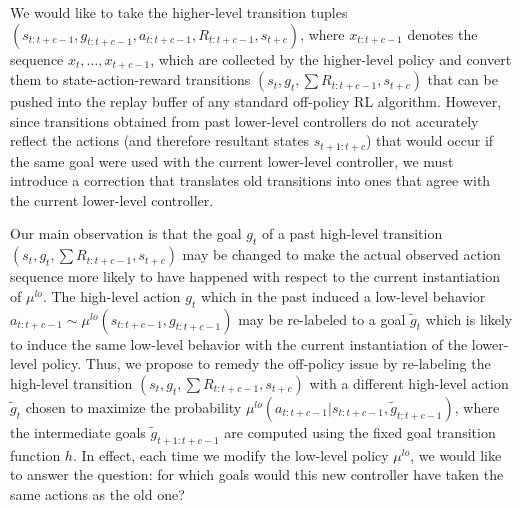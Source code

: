 \documentclass{article}
\begin{document}
We would like to take the higher-level transition tuples $(s_{t:t+c-1}, g_{t:t+c-1}, a_{t:t+c-1}, R_{t:t+c-1}, s_{t+c})$, where $x_{t:t+c-1}$ denotes the sequence $x_t,\dots,x_{t+c-1}$,
which are collected by the higher-level policy and convert them to state-action-reward transitions
$(s_t, g_t, \sum R_{t:t+c-1}, s_{t+c})$ that can be pushed into the replay buffer of any standard off-policy RL algorithm.
However, since transitions obtained from past lower-level controllers do not accurately reflect the actions (and therefore resultant states $s_{t+1:t+c}$) that would occur if the same goal were used with the current lower-level controller, we must introduce a correction that translates old transitions into ones that agree with the current lower-level controller.%


Our main observation is that the goal $g_t$ of a past high-level transition $(s_t, g_t, \sum R_{t:t+c-1}, s_{t+c})$ may be changed to make the actual observed action sequence more likely to have happened with respect to the current instantiation of $\mu^{lo}$.
The high-level action $g_t$ which in the past induced a low-level behavior $a_{t:t+c-1}\sim\mu^{lo}(s_{t:t+c-1}, g_{t:t+c-1})$ may be re-labeled to a goal $\tilde{g}_t$ which is likely to induce the same low-level behavior with the current instantiation of the lower-level policy.
Thus, we propose to remedy the off-policy issue by re-labeling the high-level transition $(s_t, g_t, \sum R_{t:t+c-1}, s_{t+c})$ with a different high-level action $\tilde{g}_t$ chosen to maximize the
probability $\mu^{lo}(a_{t:t+c-1}|s_{t:t+c-1}, \tilde{g}_{t:t+c-1})$, where the intermediate goals $\tilde{g}_{t+1:t+c-1}$ are computed using the fixed goal transition function $h$. In effect, each time we modify the low-level policy $\mu^{lo}$, we would like to answer the question: for which goals would this new controller have taken the same actions as the old one?
\end{document}
